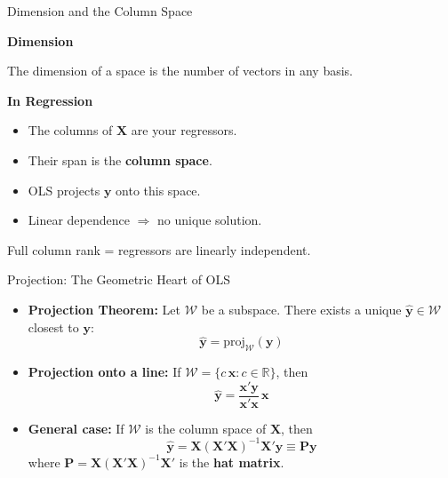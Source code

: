 \documentclass[aspectratio=169, handout, t]{beamer}
\numberwithin{equation}{section}
\begin{document}
\begin{frame}{Dimension and the Column Space}

\textbf{Dimension}

The dimension of a space is the number of vectors in any basis.

\vspace{0.4cm}

\textbf{In Regression}\pause

\begin{itemize}
    \item The columns of $\bm{X}$ are your regressors.
    \item Their span is the \textbf{column space}.\pause
    \item OLS projects $\bm{y}$ onto this space.
    \item Linear dependence $\Rightarrow$ no unique solution.
\end{itemize}

\vspace{0.4cm}

Full column rank = regressors are linearly independent.

\end{frame}


\begin{frame}{Projection: The Geometric Heart of OLS}
\begin{itemize}
    \item \textbf{Projection Theorem:} Let $\mathcal{W}$ be a subspace. There exists a unique $\hat{\bm{y}}\in \mathcal{W}$ closest to $\bm{y}$:
    $$\hat{\bm{y}} = \text{proj}_{\mathcal{W}}(\bm{y})$$\pause
    \item \textbf{Projection onto a line:} If $\mathcal{W}=\{c\,\bm{x}:c\in \mathbb{R}\}$, then
    $$\hat{\bm{y}} = \frac{\bm{x}'\bm{y}}{\bm{x}'\bm{x}}\,\bm{x}$$\pause
    \item \textbf{General case:} If $\mathcal{W}$ is the column space of $\bm{X}$, then
    $$\hat{\bm{y}} = \bm{X}(\bm{X}'\bm{X})^{-1}\bm{X}'\bm{y}\equiv \bm{P}\bm{y}$$
    where $\bm{P}=\bm{X}(\bm{X}'\bm{X})^{-1}\bm{X}'$ is the \textbf{hat matrix}.
    \end{itemize}
\end{frame}
\end{document}
